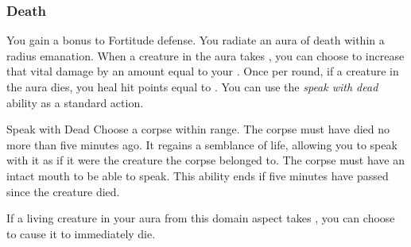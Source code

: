         \subsubsection{Death}
             You gain a  bonus to Fortitude defense.
             You radiate an aura of death within a \areamed radius emanation.
            When a creature in the aura takes , you can choose to increase that vital damage by an amount equal to your .
            Once per round, if a creature in the aura dies, you heal hit points equal to .
             You can use the \textit{speak with dead} ability as a standard action.
            \begin{attuneability}{Speak with Dead}
                Choose a corpse within \rngclose range.
                The corpse must have died no more than five minutes ago.
                It regains a semblance of life, allowing you to speak with it as if it were the creature the corpse belonged to.
                The corpse must have an intact mouth to be able to speak.
                This ability ends if five minutes have passed since the creature died.
            \end{attuneability}
             If a living creature in your aura from this domain aspect takes , you can choose to cause it to immediately die.

